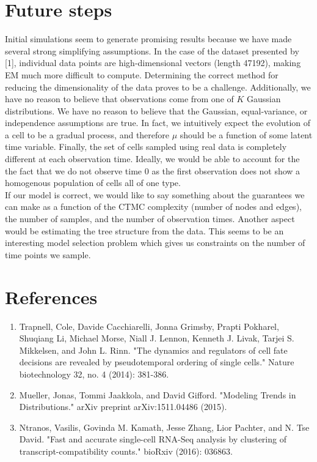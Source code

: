 \documentclass[11pt,onecolumn]{article}
\begin{document}
\section{Future steps}
Initial simulations seem to generate promising results because we have made several strong simplifying assumptions. In the case of the dataset presented by [1], individual data points are high-dimensional vectors (length 47192), making EM much more difficult to compute. Determining the correct method for reducing the dimensionality of the data proves to be a challenge. Additionally, we have no reason to believe that observations come from one of $K$ Gaussian distributions. We have no reason to believe that the Gaussian, equal-variance, or independence assumptions are true. In fact, we intuitively expect the evolution of a cell to be a gradual process, and therefore $\mu$ should be a function of some latent time variable. Finally, the set of cells sampled using real data is completely different at each observation time. Ideally, we would be able to account for the the fact that we do not observe time 0 as the first observation does not show a homogenous population of cells all of one type. \\

If our model is correct, we would like to say something about the guarantees we can make as a function of the CTMC complexity (number of nodes and edges), the number of samples, and the number of observation times. Another aspect would  be estimating the tree structure from the data. This seems to be an interesting model selection problem which gives us constraints on the number of time points we sample.

\section{References}
\begin{enumerate}
	\item Trapnell, Cole, Davide Cacchiarelli, Jonna Grimsby, Prapti Pokharel, Shuqiang Li, Michael Morse, Niall J. Lennon, Kenneth J. Livak, Tarjei S. Mikkelsen, and John L. Rinn. "The dynamics and regulators of cell fate decisions are revealed by pseudotemporal ordering of single cells." Nature biotechnology 32, no. 4 (2014): 381-386.
	\item Mueller, Jonas, Tommi Jaakkola, and David Gifford. "Modeling Trends in Distributions." arXiv preprint arXiv:1511.04486 (2015).
	\item Ntranos, Vasilis, Govinda M. Kamath, Jesse Zhang, Lior Pachter, and N. Tse David. "Fast and accurate single-cell RNA-Seq analysis by clustering of transcript-compatibility counts." bioRxiv (2016): 036863.
\end{enumerate}
\end{document}
